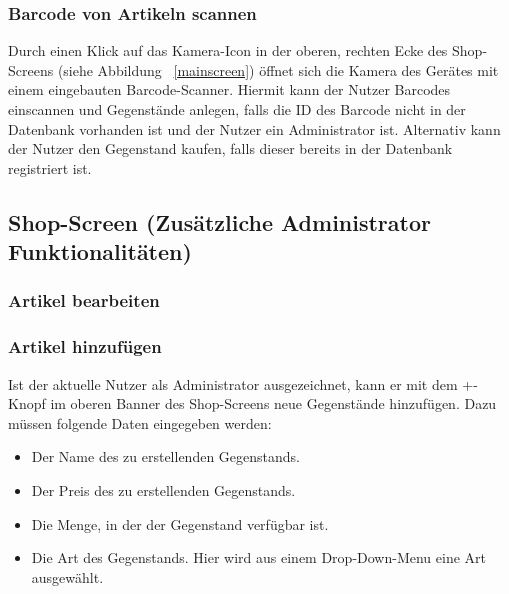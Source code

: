 

\subsubsection{Barcode von Artikeln scannen} \label{subsubsec:shop-scan-item}

Durch einen Klick auf das Kamera-Icon in der oberen, rechten Ecke des Shop-Screens (siehe Abbildung ~\ref{mainscreen}) öffnet sich die Kamera des Gerätes mit einem eingebauten Barcode-Scanner.
Hiermit kann der Nutzer Barcodes einscannen und Gegenstände anlegen, falls die ID des Barcode nicht in der Datenbank vorhanden ist und der Nutzer ein Administrator ist.
Alternativ kann der Nutzer den Gegenstand kaufen, falls dieser bereits in der Datenbank registriert ist.

\subsection{Shop-Screen (Zusätzliche Administrator Funktionalitäten)} \label{subsec:shop-screen-admin}

\subsubsection{Artikel bearbeiten} \label{subsubsec:shop-edit-items}

\subsubsection{Artikel hinzufügen} \label{subsubsec:shop-add-items}

Ist der aktuelle Nutzer als Administrator ausgezeichnet, kann er mit dem +-Knopf im oberen Banner des Shop-Screens neue Gegenstände hinzufügen.
Dazu müssen folgende Daten eingegeben werden:

\begin{itemize}
	\item Der Name des zu erstellenden Gegenstands.

	\item Der Preis des zu erstellenden Gegenstands.

	\item Die Menge, in der der Gegenstand verfügbar ist.

	\item Die Art des Gegenstands.
	Hier wird aus einem Drop-Down-Menu eine Art ausgewählt.
\end{itemize}

